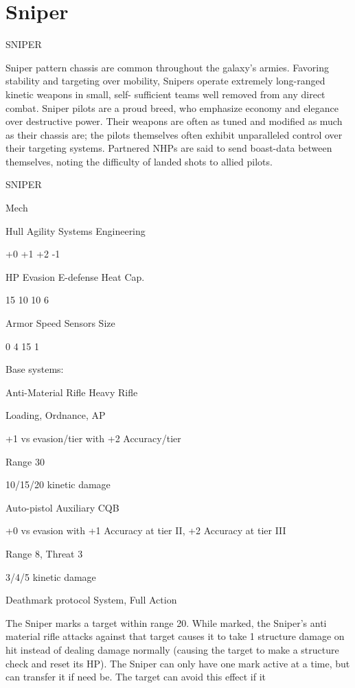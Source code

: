 \section{Sniper}

                                                 SNIPER  

Sniper pattern chassis are common throughout the galaxy’s armies. Favoring stability and  
targeting over mobility, Snipers operate extremely long-ranged kinetic weapons in small, self- 
sufficient teams well removed from any direct combat. Sniper pilots are a proud breed, who  
emphasize economy and elegance over destructive power. Their weapons are often as tuned and  
modified as much as their chassis are; the pilots themselves often exhibit unparalleled control  
over their targeting systems. Partnered NHPs are said to send boast-data between themselves,  
noting the difficulty of landed shots to allied pilots. 
 

 SNIPER 

 Mech 

 Hull       Agility      Systems       Engineering 

 +0         +1           +2            -1 

 HP         Evasion      E-defense     Heat Cap. 

 15         10           10            6 

 Armor      Speed        Sensors       Size 

 0          4            15            1 

Base systems:
 
Anti-Material Rifle  
Heavy Rifle
 
Loading, Ordnance, AP
 
+1 vs evasion/tier with +2 Accuracy/tier
 
Range 30
 
10/15/20 kinetic damage
 

Auto-pistol  
Auxiliary CQB
 
+0 vs evasion with +1 Accuracy at tier II, +2 Accuracy at tier III
 
Range 8, Threat 3
 
3/4/5 kinetic damage
 

Deathmark protocol  
System, Full Action
 
The Sniper marks a target within range 20. While marked, the Sniper’s anti material rifle attacks  
against that target causes it to take 1 structure damage on hit instead of dealing damage  
normally (causing the target to make a structure check and reset its HP). The Sniper can only  
have one mark active at a time, but can transfer it if need be. The target can avoid this effect if it  

